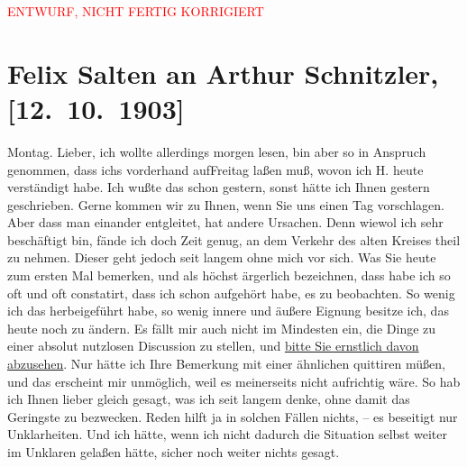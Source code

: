 
\begin{center}
            \textcolor{red}{ENTWURF, NICHT FERTIG KORRIGIERT}
                      \end{center}
            
         
         \renewcommand{\erwaehntePersonen}{Personen: Hugo von Hofmannsthal, Olga Schnitzler, Heinrich Schnitzler}
         \renewcommand{\erwaehnteOrte}{Orte: Wien}
         \renewcommand{\erwaehnteWerke}{}
               \section[Felix Salten an Arthur Schnitzler, {[}12. 10. 1903{]}]{ Felix Salten an Arthur Schnitzler, {[}12. 10. 1903{]}}\nopagebreak{}\rehead{ }\begin{ledgroupsized}[t]{13cm}\normalsize\beginnumbering \toendnotes[C]{\smallbreak\pagebreak[2]} 
\toendnotes[C]{\smallbreak}\pstart
           \raggedleft{}{\pb}Montag.\pend
           \pstart
           Lieber, ich wollte allerdings morgen lesen, bin
      aber so in Anspruch genommen, dass ichs vorderhand aufFreitag laßen muß, wovon ich
               H. heute verständigt habe. Ich wußte das
      schon gestern, sonst hätte ich Ihnen gestern
      geschrieben. Gerne kommen wir zu Ihnen,
      wenn Sie uns einen Tag vorschlagen. Aber
      dass man einander entgleitet, hat andere Ursachen. Denn wiewol ich sehr beschäftigt bin,
      fände ich doch Zeit genug, an dem Verkehr
      des alten Kreises theil zu nehmen. Dieser geht jedoch seit langem ohne mich vor sich. Was
      Sie heute zum ersten Mal bemerken, und als
      höchst ärgerlich bezeichnen, dass habe ich so
      oft und oft constatirt, dass ich schon aufgehört habe, es zu beobachten. So wenig ich
      das herbeigeführt habe, so wenig innere und
      äußere Eignung besitze ich, das heute noch
      zu ändern. Es fällt mir auch nicht im Mindesten ein, die Dinge zu einer absolut nutzlosen Discussion zu stellen, und \uline{bitte Sie 
         ernstlich davon abzusehen}. Nur hätte ich Ihre
      Bemerkung mit einer ähnlichen quittiren
      müßen, und das erscheint mir unmöglich,
      weil es meinerseits nicht aufrichtig wäre.
      So hab ich Ihnen lieber gleich gesagt, was
      ich seit langem denke, ohne damit
      das Geringste zu bezwecken. Reden hilft ja
      in solchen Fällen nichts, – es beseitigt nur
      Unklarheiten. Und ich hätte, wenn
      ich nicht dadurch die Situation selbst weiter
      im Unklaren gelaßen hätte, sicher noch
      weiter nichts gesagt. 
               

\end{ledgroupsized}
